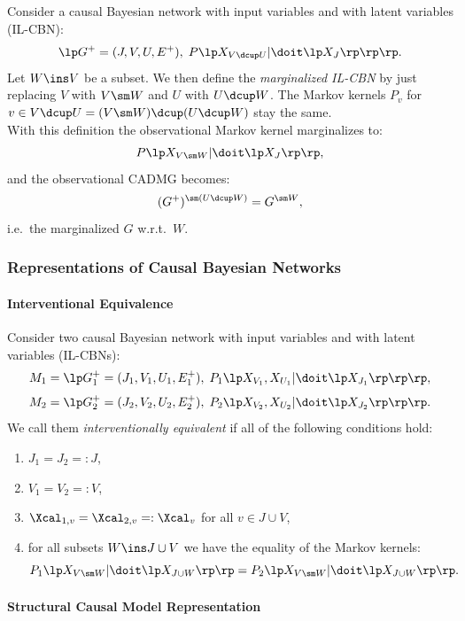 \begin{Def}
    Consider a causal Bayesian network with input variables and with latent variables (IL-CBN): 
    \[ \lp G^+=(J,V,U,E^+), \; P\lp X_{V \dcup U}| \doit\lp X_J \rp\rp \rp.\]
    Let $W \ins V$ be a subset.
    We then define the \emph{marginalized IL-CBN} by just replacing $V$ with $V \sm W$ and $U$ with $U \dcup W$. 
    The Markov kernels $P_v$ for $v \in V \dcup U = (V \sm W) \dcup (U \dcup W)$ stay the same.\\
    With this definition the observational Markov kernel marginalizes to:
    \[ P\lp X_{V\sm W}|\doit\lp X_J\rp\rp,  \]
    and the observational CADMG becomes:
    \[ (G^+)^{\sm (U \dcup W)} = G^{\sm W},\]
    i.e.\ the marginalized $G$ w.r.t.\ $W$.
\end{Def}

\subsubsection{Representations of Causal Bayesian Networks}
\paragraph{Interventional Equivalence}

\begin{Def}
    Consider two  causal Bayesian network with input variables and with latent variables (IL-CBNs):
    \[ M_1 = \lp G^+_1=(J_1,V_1,U_1,E^+_1), \; P_1\lp X_{V_1}, X_{U_1}| \doit\lp X_{J_1} \rp\rp \rp,\]
    \[ M_2 = \lp G^+_2=(J_2,V_2,U_2,E^+_2), \; P_2\lp X_{V_2},X_{U_2}| \doit\lp X_{J_2} \rp\rp \rp.\]
    We call them \emph{interventionally equivalent} if all of the following conditions hold:
    \begin{enumerate}
        \item $J_1 = J_2 =:J$,
        \item $V_1 = V_2 =:V$,
        \item $\Xcal_{1,v} = \Xcal_{2,v} =: \Xcal_v$ for all $v \in J \cup V$,
        \item for all subsets $W \ins J \cup V$ we have the equality of the Markov kernels:
            \[P_1\lp X_{V \sm W}| \doit\lp X_{J \cup W} \rp\rp  = P_2\lp X_{V\sm W}| \doit\lp X_{J \cup W} \rp\rp.\]
    \end{enumerate}
\end{Def}


\paragraph{Structural Causal Model Representation}

